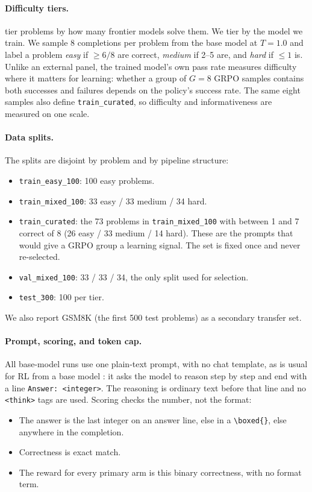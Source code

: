 \documentclass{article}
\begin{document}
\paragraph{Difficulty tiers.} \citet{bauer2026} tier problems by how many frontier models solve them. We tier by the model we train. We sample 8 completions per problem from the base model at $T{=}1.0$ and label a problem \emph{easy} if $\geq 6/8$ are correct, \emph{medium} if 2--5 are, and \emph{hard} if $\leq 1$ is. Unlike an external panel, the trained model's own pass rate measures difficulty
where it matters for learning: whether a group of $G{=}8$ GRPO samples contains both successes and failures depends on the policy's success rate. The same eight samples also define \texttt{train\_curated}, so difficulty and informativeness are measured on one scale.

\paragraph{Data splits.} The splits are disjoint by problem and by pipeline structure:
\begin{itemize}
  \item \texttt{train\_easy\_100}: 100 easy problems.
  \item \texttt{train\_mixed\_100}: 33 easy / 33 medium / 34 hard.
  \item \texttt{train\_curated}: the 73 problems in \texttt{train\_mixed\_100} with between 1 and 7 correct of 8 (26 easy / 33 medium / 14 hard). These are the prompts that would give a GRPO group a learning signal. The set is fixed once and never re-selected.
  \item \texttt{val\_mixed\_100}: 33 / 33 / 34, the only split used for selection.
  \item \texttt{test\_300}: 100 per tier.
\end{itemize}
We also report GSM8K (the first 500 test problems) as a secondary transfer set.

\paragraph{Prompt, scoring, and token cap.} All base-model runs use one plain-text prompt, with no chat template, as is
usual for RL from a base model \citep{deepseek2025r1}: it asks the model to reason step by step and end with a line \texttt{Answer: <integer>}. The reasoning is ordinary text before that line and no \texttt{<think>} tags are used. Scoring checks the number, not the format:
\begin{itemize}
  \item The answer is the last integer on an answer line, else in a \verb|\boxed{}|, else anywhere in the completion.
  \item Correctness is exact match.
  \item The reward for every primary arm is this binary correctness, with no format term.
\end{itemize}
\end{document}
